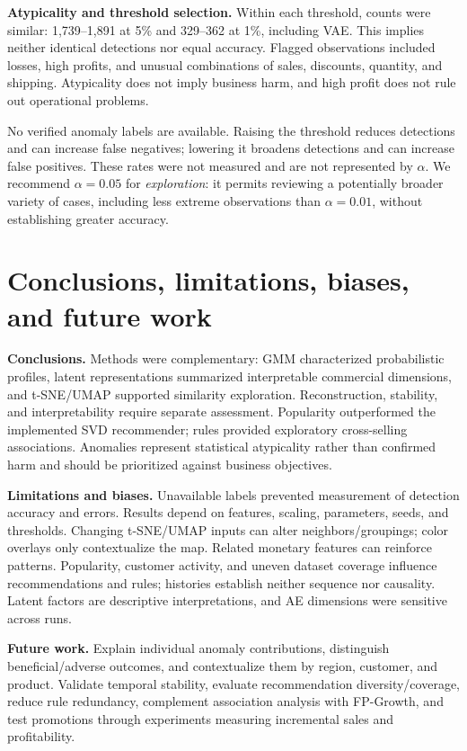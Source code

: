 \documentclass[11pt,a4paper]{article}
\begin{document}
\textbf{Atypicality and threshold selection.} Within each threshold, counts were similar: 1,739--1,891 at 5\% and 329--362 at 1\%, including VAE. This implies neither identical detections nor equal accuracy. Flagged observations included losses, high profits, and unusual combinations of sales, discounts, quantity, and shipping. Atypicality does not imply business harm, and high profit does not rule out operational problems.

No verified anomaly labels are available. Raising the threshold reduces detections and can increase false negatives; lowering it broadens detections and can increase false positives. These rates were not measured and are not represented by $\alpha$. We recommend $\alpha=0.05$ for \emph{exploration}: it permits reviewing a potentially broader variety of cases, including less extreme observations than $\alpha=0.01$, without establishing greater accuracy.

\section{Conclusions, limitations, biases, and future work}
\textbf{Conclusions.} Methods were complementary: GMM characterized probabilistic profiles, latent representations summarized interpretable commercial dimensions, and t-SNE/UMAP supported similarity exploration. Reconstruction, stability, and interpretability require separate assessment. Popularity outperformed the implemented SVD recommender; rules provided exploratory cross-selling associations. Anomalies represent statistical atypicality rather than confirmed harm and should be prioritized against business objectives.

\textbf{Limitations and biases.} Unavailable labels prevented measurement of detection accuracy and errors. Results depend on features, scaling, parameters, seeds, and thresholds. Changing t-SNE/UMAP inputs can alter neighbors/groupings; color overlays only contextualize the map. Related monetary features can reinforce patterns. Popularity, customer activity, and uneven dataset coverage influence recommendations and rules; histories establish neither sequence nor causality. Latent factors are descriptive interpretations, and AE dimensions were sensitive across runs.

\textbf{Future work.} Explain individual anomaly contributions, distinguish beneficial/adverse outcomes, and contextualize them by region, customer, and product. Validate temporal stability, evaluate recommendation diversity/coverage, reduce rule redundancy, complement association analysis with FP-Growth, and test promotions through experiments measuring incremental sales and profitability.
\end{document}
